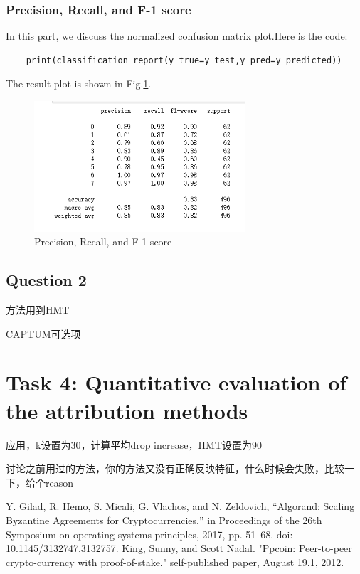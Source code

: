 \documentclass[conference]{IEEEtran}
\begin{document}
\subsubsection{Precision, Recall, and F-1 score}
In this part, we discuss the normalized confusion matrix plot.Here is the code:
\begin{lstlisting}
    print(classification_report(y_true=y_test,y_pred=y_predicted))
\end{lstlisting}
The result plot is shown in Fig.\ref{Fig.t3q1d}.
\begin{figure}[H] 
    \centering %
    \includegraphics[width=0.7\textwidth]{T3Q1d.png} %
    \caption{Precision, Recall, and F-1 score} %
    \label{Fig.t3q1d} %
\end{figure}

\subsection{Question 2}
方法用到HMT

CAPTUM可选项

\section{Task 4: Quantitative evaluation of the attribution methods}
应用，k设置为30，计算平均drop increase，HMT设置为90

讨论之前用过的方法，你的方法又没有正确反映特征，什么时候会失败，比较一下，给个reason


\begin{thebibliography}{00}
Y. Gilad, R. Hemo, S. Micali, G. Vlachos, and N. Zeldovich, “Algorand: Scaling Byzantine Agreements for Cryptocurrencies,” in Proceedings of the 26th Symposium on operating systems principles, 2017, pp. 51–68. doi: 10.1145/3132747.3132757.
 King, Sunny, and Scott Nadal. "Ppcoin: Peer-to-peer crypto-currency with proof-of-stake." self-published paper, August 19.1, 2012.

\end{thebibliography}
\end{document}
